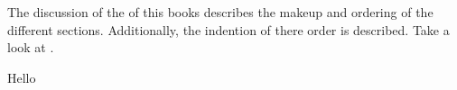 \documentclass[crop=false,class=scrbook]{standalone}
\begin{document}
The discussion of the  of this books describes the makeup and ordering
of the different sections.
Additionally, the indention of there order is described.
Take a look at .

\begin{defn}
Hello
\end{defn}
\end{document}
